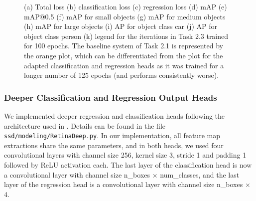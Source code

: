 \documentclass{article}
\begin{document}
\begin{figure}[t!]
    \centering
    \subfigure[]{}
    \subfigure[]{}
    \subfigure[]{}
    \subfigure[]{}
    \subfigure[]{}
    \subfigure[]{}
    \subfigure[]{}
    \subfigure[]{}
    \subfigure[]{}
    \subfigure[]{}
    \caption{(a) Total loss (b) classification loss (c) regression loss (d) mAP (e) mAP@0.5 (f) mAP for small objects (g) mAP for medium objects (h) mAP for large objects (i) AP for object class car (j) AP for object class person (k) legend for the iterations in Task 2.3 trained for 100 epochs. The baseline system of Task 2.1 is represented by the orange plot, which can be differentiated from the plot for the adapted classification and regression heads as it was trained for a longer number of 125 epochs (and performs consistently worse).}
    \label{fig:loss-2-3}
\end{figure}

\subsubsection*{Deeper Classification and Regression Output Heads}
 We implemented deeper regression and classification heads following the architecture used in \cite{lin2017focal}. Details can be found in the file \texttt{ssd/modeling/RetinaDeep.py}. In our implementation, all feature map extractions share the same parameters, and in both heads, we used four convolutional layers with channel size 256, kernel size 3, stride 1 and padding 1 followed by ReLU activation each. The last layer of the classification head is now a convolutional layer with channel size n\_boxes $\times$ num\_classes, and the last layer of the regression head is a convolutional layer with channel size n\_boxes $\times$ 4.
 
\end{document}

